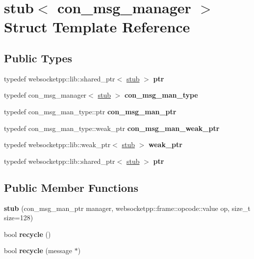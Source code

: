 \hypertarget{structstub}{}\section{stub$<$ con\+\_\+msg\+\_\+manager $>$ Struct Template Reference}
\label{structstub}
\subsection*{Public Types}
\begin{DoxyCompactItemize}
\item 
\mbox{\label{structstub_a0d35742a05f812194c64f1d51d53d116}} 
typedef websocketpp\+::lib\+::shared\+\_\+ptr$<$ \mbox{\hyperlink{structstub}{stub}} $>$ {\bfseries ptr}
\item 
\mbox{\label{structstub_a871872eb48631cc26c0ccfa874fbb069}} 
typedef con\+\_\+msg\+\_\+manager$<$ \mbox{\hyperlink{structstub}{stub}} $>$ {\bfseries con\+\_\+msg\+\_\+man\+\_\+type}
\item 
\mbox{\label{structstub_a8060330f1080540d2e35d48e038c1314}} 
typedef con\+\_\+msg\+\_\+man\+\_\+type\+::ptr {\bfseries con\+\_\+msg\+\_\+man\+\_\+ptr}
\item 
\mbox{\label{structstub_a0ff78a234640782ab4b10b0e1335b075}} 
typedef con\+\_\+msg\+\_\+man\+\_\+type\+::weak\+\_\+ptr {\bfseries con\+\_\+msg\+\_\+man\+\_\+weak\+\_\+ptr}
\item 
\mbox{\label{structstub_ac65faf380006155d470fbfe954772c92}} 
typedef websocketpp\+::lib\+::weak\+\_\+ptr$<$ \mbox{\hyperlink{structstub}{stub}} $>$ {\bfseries weak\+\_\+ptr}
\item 
\mbox{\label{structstub_a0d35742a05f812194c64f1d51d53d116}} 
typedef websocketpp\+::lib\+::shared\+\_\+ptr$<$ \mbox{\hyperlink{structstub}{stub}} $>$ {\bfseries ptr}
\end{DoxyCompactItemize}
\subsection*{Public Member Functions}
\begin{DoxyCompactItemize}
\item 
\mbox{\label{structstub_a3597f164543502f6894f79ef3ec35046}} 
{\bfseries stub} (con\+\_\+msg\+\_\+man\+\_\+ptr manager, websocketpp\+::frame\+::opcode\+::value op, size\+\_\+t size=128)
\item 
\mbox{\label{structstub_accf91b8d6c3a0932e8c5ad7870eb934a}} 
bool {\bfseries recycle} ()
\item 
\mbox{\label{structstub_aef03fdad19f7d5a7cded40f887904d36}} 
bool {\bfseries recycle} (message $\ast$)
\end{DoxyCompactItemize}
